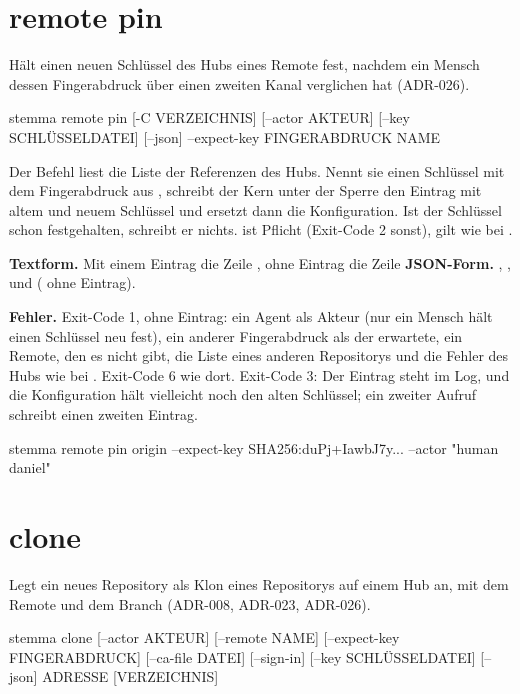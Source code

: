 \section{remote pin}

Hält einen neuen Schlüssel des Hubs eines Remote fest, nachdem ein Mensch dessen Fingerabdruck
über einen zweiten Kanal verglichen hat (ADR-026).

\starttyping
stemma remote pin [-C VERZEICHNIS] [--actor AKTEUR] [--key SCHLÜSSELDATEI] [--json]
                  --expect-key FINGERABDRUCK NAME
\stoptyping

Der Befehl liest die Liste der Referenzen des Hubs. Nennt sie einen Schlüssel mit dem
Fingerabdruck aus , schreibt der Kern unter der Sperre den Eintrag
 mit altem und neuem Schlüssel und ersetzt dann die Konfiguration.
Ist der Schlüssel schon festgehalten, schreibt er nichts.  ist Pflicht
(Exit-Code 2 sonst),  gilt wie bei .

{\bf Textform.} Mit einem Eintrag die Zeile
,
ohne Eintrag die Zeile
{\bf JSON-Form.} , ,  und  (
ohne Eintrag).

{\bf Fehler.} Exit-Code 1, ohne Eintrag: ein Agent als Akteur (nur ein Mensch hält einen
Schlüssel neu fest), ein anderer Fingerabdruck als der erwartete, ein Remote, den es nicht gibt,
die Liste eines anderen Repositorys und die Fehler des Hubs wie bei .
Exit-Code 6 wie dort. Exit-Code 3: Der Eintrag steht im Log, und die Konfiguration hält
vielleicht noch den alten Schlüssel; ein zweiter Aufruf schreibt einen zweiten Eintrag.

\starttyping
stemma remote pin origin --expect-key SHA256:duPj+IawbJ7y... --actor "human daniel"
\stoptyping

\section{clone}

Legt ein neues Repository als Klon eines Repositorys auf einem Hub an, mit dem Remote
 und dem Branch  (ADR-008, ADR-023, ADR-026).

\starttyping
stemma clone [--actor AKTEUR] [--remote NAME] [--expect-key FINGERABDRUCK]
             [--ca-file DATEI] [--sign-in] [--key SCHLÜSSELDATEI] [--json]
             ADRESSE [VERZEICHNIS]
\stoptyping

